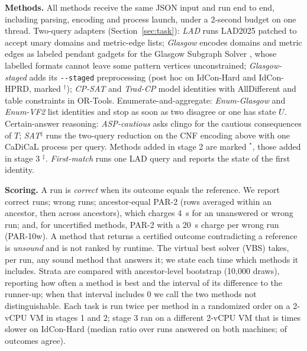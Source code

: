 \textbf{Methods.} All methods receive the same JSON input and run end to end, including parsing, encoding and process launch, under a 2-second budget on one thread. Two-query adapters (Section~\ref{sec:task}): \emph{LAD} runs LAD2025 \cite{lad} patched to accept unary domains and metric-edge lists; \emph{Glasgow} encodes domains and metric edges as labeled pendant gadgets for the Glasgow Subgraph Solver \cite{glasgow}, whose labelled formats cannot leave some pattern vertices unconstrained; \emph{Glasgow-staged} adds its \texttt{-{}-staged} preprocessing (post hoc on IdCon-Hard and IdCon-HPRD, marked $^\dagger$); \emph{CP-SAT} and \emph{Trad-CP} model identities with AllDifferent and table constraints in OR-Tools. Enumerate-and-aggregate: \emph{Enum-Glasgow} and \emph{Enum-VF2} \cite{networkx,cordella} list identities and stop as soon as two disagree or one has state $U$. Certain-answer reasoning: \emph{ASP-cautious} asks clingo \cite{clingo} for the cautious consequences of $T$; \emph{SAT}$^\ddagger$ runs the two-query reduction on the CNF encoding above with one CaDiCaL process per query. Methods added in stage 2 are marked $^\ast$, those added in stage 3 $^\ddagger$. \emph{First-match} runs one LAD query and reports the state of the first identity.

\textbf{Scoring.} A run is \emph{correct} when its outcome equals the reference. We report correct runs; wrong runs; ancestor-equal PAR-2 (rows averaged within an ancestor, then across ancestors), which charges 4~s for an unanswered or wrong run; and, for uncertified methods, PAR-2 with a 20~s charge per wrong run (PAR-10w). A method that returns a certified outcome contradicting a reference is \emph{unsound} and is not ranked by runtime. The virtual best solver (VBS) takes, per run, any sound method that answers it; we state each time which methods it includes. Strata are compared with ancestor-level bootstrap (10,000 draws), reporting how often a method is best and the interval of its difference to the runner-up; when that interval includes 0 we call the two methods not distinguishable. Each task is run twice per method in a randomized order on a 2-vCPU VM in stages 1 and 2; stage 3 ran on a different 2-vCPU VM that is \calibRatio{} times slower on IdCon-Hard (median ratio over \calibBoth{} runs answered on both machines; \calibAgree{} of \calibRuns{} outcomes agree).

